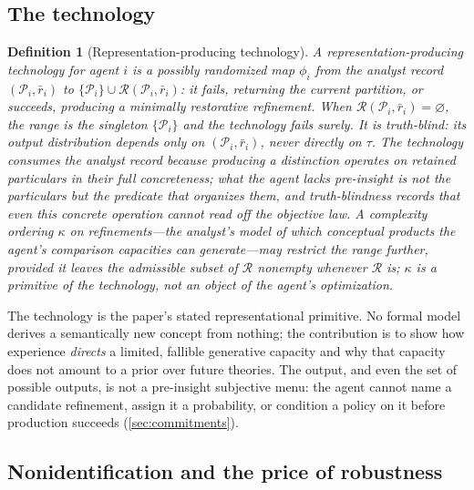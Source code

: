 \documentclass[11pt]{article}
\newtheorem{definition}[assumption]{Definition}
\theoremstyle{definition}
\newcommand{\emptysetset}{\varnothing}
\begin{document}
\subsection{The technology}

\begin{definition}[Representation-producing technology]
\label{def:technology}
A representation-producing technology for agent $i$ is a possibly randomized
map $\phi_i$ from the analyst record $(\mathcal P_i,\bar r_i)$ to
$\{\mathcal P_i\}\cup\mathcal R(\mathcal P_i,\bar r_i)$: it fails, returning the
current partition, or succeeds, producing a minimally restorative refinement.
When $\mathcal R(\mathcal P_i,\bar r_i)=\emptysetset$, the range is the
singleton $\{\mathcal P_i\}$ and the technology fails surely.  It is
\emph{truth-blind}: its output distribution depends only on
$(\mathcal P_i,\bar r_i)$, never directly on $\tau$.  The technology consumes
the analyst record because producing a distinction operates on retained
particulars in their full concreteness; what the agent lacks pre-insight is
not the particulars but the predicate that organizes them, and truth-blindness
records that even this concrete operation cannot read off the objective law.  A
complexity ordering $\kappa$ on refinements---the analyst's model of which
conceptual products the agent's comparison capacities can generate---may
restrict the range further, provided it leaves the admissible subset of
$\mathcal R$ nonempty whenever $\mathcal R$ is; $\kappa$ is a primitive of the
technology, not an object of the agent's optimization.
\end{definition}

The technology is the paper's stated representational primitive.  No formal
model derives a semantically new concept from nothing; the contribution is to
show how experience \emph{directs} a limited, fallible generative capacity
and why that capacity does not amount to a prior over future theories.  The
output, and even the set of possible outputs, is not a pre-insight
subjective menu: the agent cannot name a candidate refinement, assign it a
probability, or condition a policy on it before production succeeds
(\cref{sec:commitments}).

\subsection{Nonidentification and the price of robustness}
\end{document}
